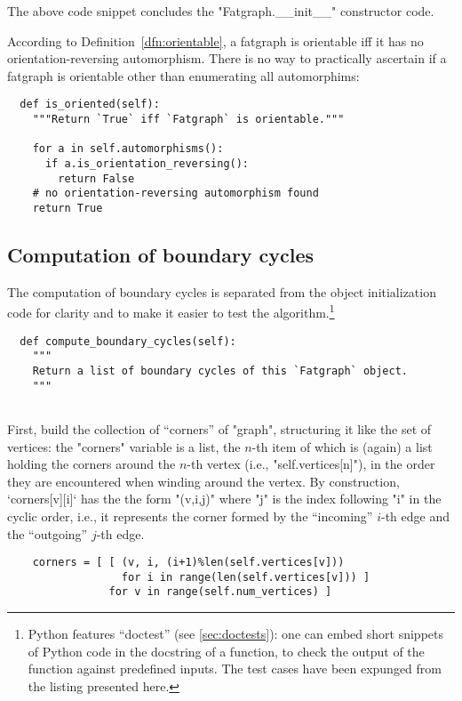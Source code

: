 The above code snippet concludes the "Fatgraph.__init__" constructor
code.

According to Definition~\ref{dfn:orientable}, a fatgraph is orientable iff it
has no orientation-reversing automorphism.  There is no
way to practically ascertain if a fatgraph is orientable other than
enumerating all automorphims:
\begin{lstlisting}
  def is_oriented(self):
    """Return `True` iff `Fatgraph` is orientable."""

    for a in self.automorphisms():
      if a.is_orientation_reversing():
        return False
    # no orientation-reversing automorphism found
    return True

\end{lstlisting}


\subsection{Computation of boundary cycles}
\label{sec:compute-boundary-cycles}

The computation of boundary cycles is separated from the object
initialization code for clarity and to make it easier to test the
algorithm.\footnote{Python features ``doctest'' (see
  \ref{sec:doctests}): one can embed short snippets of Python code in
  the docstring of a function, to check the output of the function
  against predefined inputs.  The test cases have been expunged from
  the listing presented here.}
\begin{lstlisting}
  def compute_boundary_cycles(self):
    """
    Return a list of boundary cycles of this `Fatgraph` object.
    """
    
\end{lstlisting}
First, build the collection of ``corners'' of "graph", structuring it
like the set of vertices: the "corners" variable is a list, the $n$-th
item of which is (again) a list holding the corners around the $n$-th
vertex (i.e., "self.vertices[n]"), in the order they are encountered
when winding around the vertex.  By construction, `corners[v][i]` has
the the form "(v,i,j)" where "j" is the index following "i" in the
cyclic order, i.e., it represents the corner formed by the
``incoming'' $i$-th edge and the ``outgoing'' $j$-th edge.
\begin{lstlisting}
    corners = [ [ (v, i, (i+1)%len(self.vertices[v]))
                  for i in range(len(self.vertices[v])) ]
                for v in range(self.num_vertices) ]

\end{lstlisting}


